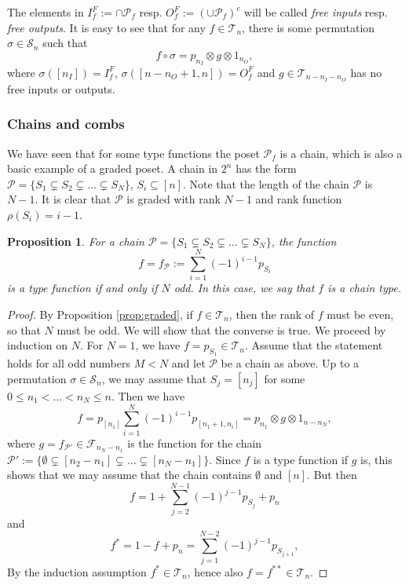\documentclass[12pt]{article}
\newtheorem{prop}{Proposition}
\theoremstyle{definition}
\theoremstyle{remark}
\def\Te{\mathcal T}
\def\Fe{\mathcal F}
\def\Pe{\mathcal P}
\def\permut{\mathscr{S}}
\begin{document}
The elements in $I^F_{f}:=\cap\Pe_f$ resp. $O^F_{f}:=(\cup \Pe_f)^c$ will be called {\em
free inputs}  resp.
{\em free outputs}. It is easy to see that for any $f\in \Te_n$, there is some permutation
$\sigma\in \permut_n$ such that
\[
f\circ \sigma=p_{n_I}\otimes g\otimes 1_{n_O},
\]
where $\sigma([n_I])=I^F_f$, $\sigma([n-n_O+1,n])=O^F_f$ and $g\in \Te_{n-n_I-n_O}$ has no
free inputs or outputs.


\subsubsection{Chains and combs}

 We have seen that for some type functions the poset $\Pe_f$ is a chain, which is also a
 basic example of a graded poset. A chain in $2^n$ has the form  $\Pe=\{S_1\subsetneq S_2\subsetneq \dots \subsetneq
S_N\}$, $S_i\subseteq [n]$. Note that the length of the chain $\Pe$ is $N-1$.
It is clear that  $\Pe$ is graded with rank $N-1$
and rank function $\rho(S_i)=i-1$. 

\begin{prop}\label{prop:chains} For a chain   $\Pe=\{S_1\subsetneq S_2\subsetneq \dots \subsetneq
S_N\}$, the function  
\[
f=f_\Pe:=\sum_{i=1}^N (-1)^{i-1} p_{S_i}
\]
is a type function if and only if $N$ odd. In this case, we say that $f$ is a chain type.

\end{prop}

\begin{proof}
By Proposition \ref{prop:graded}, if $f\in \Te_n$, then the rank of $f$ must be even, so
that $N$ must be odd. 
We will show that the converse is true. We proceed by induction on $N$. For $N=1$, we have
$f=p_{S_1}\in \Te_n$. Assume that the statement holds for all odd numbers $M<N$ and let
$\Pe$ be a chain as above. Up to a permutation $\sigma\in \permut_n$, we may assume that
$S_j=[n_j]$ for some $0\le n_1<\dots <n_N\le n$. Then we have 
\[
f=p_{[n_1]}\sum_{i=1}^N (-1)^{i-1}p_{[n_1+1,n_i]}= p_{n_1}\otimes g\otimes 1_{n-n_N},
\]
where  $g=f_{\Pe'}\in
\Fe_{n_N-n_1}$ is the function for the chain $\Pe':=\{\emptyset\subsetneq [n_2-n_1]\subsetneq \dots
\subsetneq [n_N-n_1]\}$. Since $f$ is a type function if $g$ is, this shows that we may assume that 
the chain contains $\emptyset$ and $[n]$.  But then 
\[
f=1+\sum_{j=2}^{N-1} (-1)^{j-1}p_{S_j}+ p_{n} 
\]
and
\[
f^*=1-f+p_{n}=\sum_{j=1}^{N-2} (-1)^{j-1}p_{S_{j+1}},
\]
By the induction assumption $f^*\in \Te_n$, hence also $f=f^{**}\in
\Te_n$.
\end{proof}
\end{document}
